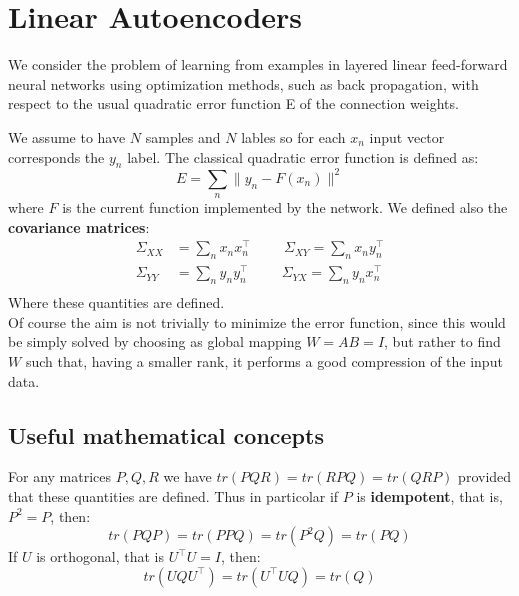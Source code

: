 \section{Linear Autoencoders}
We consider the problem of learning from examples in layered linear feed-forward neural networks using optimization methods, such as back propagation, with respect to the usual quadratic error function E of the connection weights. 

We assume to have $N$ samples and $N$ lables so for each $x_n$ input vector corresponds the $y_n$ label. The classical quadratic error function is defined as:
\[
E = \sum_n \|y_n - F(x_n)\|^2 
\]
where $F$ is the current function implemented by the network. We defined also the \textbf{covariance matrices}:
\[
\begin{split}
    \Sigma_{XX} &= \sum_n x_n x_n^\intercal \hspace{1cm} \Sigma_{XY} = \sum_n x_n y_n^\intercal\\
    \Sigma_{YY} &= \sum_n y_n y_n^\intercal \hspace{1cm} \Sigma_{YX} = \sum_n y_n x_n^\intercal\\
\end{split}
\]
Where these quantities are defined. \\

Of course the aim is not trivially to minimize the error function, since this would be simply solved by choosing as global mapping $W = AB = I$, but rather to find $W$ such that, having a smaller rank, it performs a good compression of the input data.

\subsection{Useful mathematical concepts}
For any matrices $P, Q, R$ we have $tr(PQR) = tr(RPQ) = tr(QRP)$ provided that these quantities are defined. Thus in particolar if $P$ is \textbf{idempotent}, that is, $P^2 = P$, then:
\begin{equation}\tag{a}
    tr(PQP) = tr(PPQ) = tr(P^2Q) = tr(PQ)
\end{equation}
If $U$ is orthogonal, that is $U^\intercal U = I$, then:
\begin{equation}\tag{b}
    tr(UQU^\intercal) = tr(U^\intercal UQ) = tr(Q)
\end{equation}

